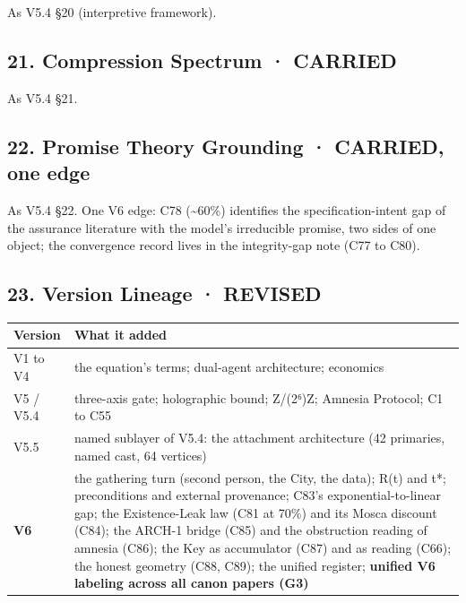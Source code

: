 \documentclass[
  11pt,
]{article}
\newcounter{none} %
\begin{document}
As V5.4 §20 (interpretive framework).

\subsection{21. Compression Spectrum ·
CARRIED}\label{compression-spectrum-carried}

As V5.4 §21.

\subsection{22. Promise Theory Grounding · CARRIED, one
edge}\label{promise-theory-grounding-carried-one-edge}

As V5.4 §22. One V6 edge: C78 (\textasciitilde60\%) identifies the
specification-intent gap of the assurance literature with the model's
irreducible promise, two sides of one object; the convergence record
lives in the integrity-gap note (C77 to C80).

\subsection{23. Version Lineage ·
REVISED}\label{version-lineage-revised}

{\def\LTcaptype{none} %
\begin{longtable}[]{@{}
  >{\raggedright\arraybackslash}p{}
  >{\raggedright\arraybackslash}p{}@{}}
\toprule\noalign{}
\begin{minipage}[b]{\linewidth}\raggedright
Version
\end{minipage} & \begin{minipage}[b]{\linewidth}\raggedright
What it added
\end{minipage} \\
\midrule\noalign{}
\endhead
\bottomrule\noalign{}
\endlastfoot
V1 to V4 & the equation's terms; dual-agent architecture; economics \\
V5 / V5.4 & three-axis gate; holographic bound; Z/(2⁶)Z; Amnesia
Protocol; C1 to C55 \\
V5.5 & named sublayer of V5.4: the attachment architecture (42
primaries, named cast, 64 vertices) \\
\textbf{V6} & the gathering turn (second person, the City, the data);
R(t) and t*; preconditions and external provenance; C83's
exponential-to-linear gap; the Existence-Leak law (C81 at 70\%) and its
Mosca discount (C84); the ARCH-1 bridge (C85) and the obstruction
reading of amnesia (C86); the Key as accumulator (C87) and as reading
(C66); the honest geometry (C88, C89); the unified register;
\textbf{unified V6 labeling across all canon papers (G3)} \\
\end{longtable}
}
\end{document}
